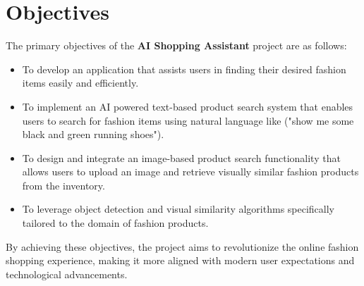 \section{Objectives}

The primary objectives of the \textbf{AI Shopping Assistant} project are as follows:

\begin{itemize}
    \item To develop an application that assists users in finding their desired fashion items easily and efficiently.
    \item To implement an AI powered text-based product search system that enables users to search for fashion items using natural language like ("show me some black and green running shoes").
    \item To design and integrate an image-based product search functionality that allows users to upload an image and retrieve visually similar fashion products from the inventory.
    \item To leverage object detection and visual similarity algorithms specifically tailored to the domain of fashion products.
\end{itemize}

By achieving these objectives, the project aims to revolutionize the online fashion shopping experience, making it more aligned with modern user expectations and technological advancements.


